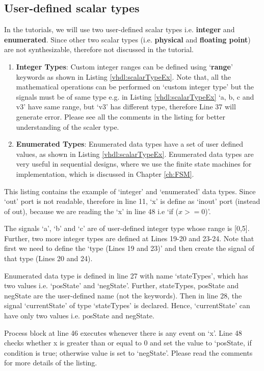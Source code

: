\subsection{User-defined scalar types}
In the tutorials, we will use two user-defined scalar types i.e. \textbf{integer} and \textbf{enumerated}. Since other two scalar types (i.e. \textbf{physical} and \textbf{floating point}) are not synthesizable, therefore not discussed in the tutorial.  
\begin{enumerate}
	\item \textbf{Integer Types}: Custom integer ranges can be defined using `\textbf{range}' keywords as shown in Listing \ref{vhdl:scalarTypeEx}. Note that, all the mathematical operations can be performed on `custom integer type' but the signals must be of same type e.g. in Listing \ref{vhdl:scalarTypeEx} `a, b, c and v3' have same range, but `v3' has different type, therefore Line 37 will generate error. Please see all the comments in the listing for better understanding of the scaler type. 
	
	\item \textbf{Enumerated Types}: Enumerated data types have a set of user defined values, as shown in Listing \ref {vhdl:scalarTypeEx}. Enumerated data types are very useful in sequential designs, where we use the finite state machines for implementation, which is discussed in Chapter \ref{ch:FSM}.
	
\end{enumerate} 

\begin{explanation}
	This listing contains the example of `integer' and `enumerated' data types. Since `out' port is not readable, therefore in line 11, `x' is define as `inout' port (instead of out), because we are reading the `x' in line 48 i.e `if ($x>=0$)'.

	The signals `a', `b' and `c' are of user-defined integer type whose range is [0,5]. Further, two more integer types are defined at Lines 19-20 and 23-24. Note that first we need to define the `type (Lines 19 and 23)' and then create the signal of that type (Lines 20 and 24). 

	Enumerated data type is defined in line 27 with name `stateTypes', which has two values i.e. `posState' and `negState'. Further, stateTypes, posState and negState are the user-defined name (not the keywords). Then in line 28, the signal `currentState' of type `stateTypes' is declared. Hence, `currentState' can have only two values i.e. posState and negState. 
	
	Process block at line 46 executes whenever there is any event on `x'. Line 48 checks whether x is greater than or equal to 0 and set the value to `posState, if condition is true; otherwise value is set to `negState'. Please read the comments for more details of the listing.	
\end{explanation}


